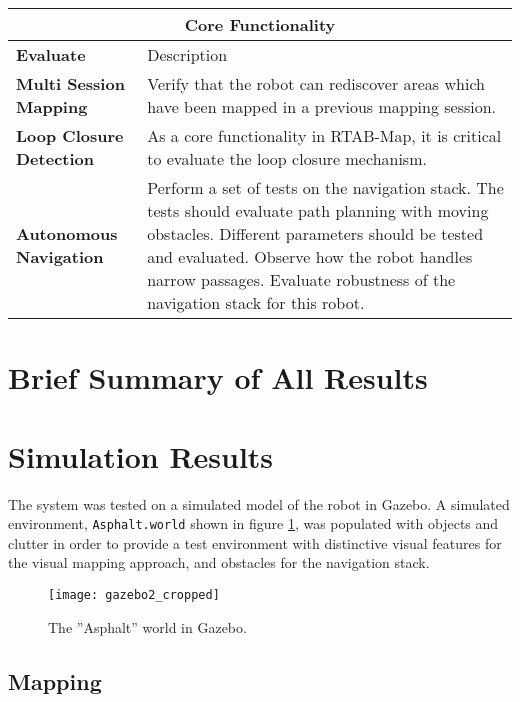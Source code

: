 \begin{table}
	\centering
	\begin{tabular}{ p{2.5cm} | p{7cm} }
	\multicolumn{2}{c}{Core Functionality}\\
\hline
	\textbf{Evaluate} & Description\\
	\hline
	\textbf{Multi Session Mapping} & Verify that the robot can rediscover areas which have been mapped in a previous mapping session.\\
	\hline
	\textbf{Loop Closure Detection} & As a core functionality in \ac{RTAB-Map}, it is critical to evaluate the loop closure mechanism.\\
	\hline
	\textbf{Autonomous Navigation} & Perform a set of tests on the navigation stack. The tests should evaluate path planning with moving obstacles. Different parameters should be tested and evaluated. Observe how the robot handles narrow passages. Evaluate robustness of the navigation stack for this robot.\\
	\hline
	\end{tabular}
	\caption{}
\end{table}

\section{Brief Summary of All Results}

\section{Simulation Results}

The system was tested on a simulated model of the robot in Gazebo. A simulated environment, \texttt{Asphalt.world} shown in figure \ref{fig:gazebo2_cropped}, was populated with objects and clutter in order to provide a test environment with distinctive visual features for the visual mapping approach, and obstacles for the navigation stack. 

\begin{figure}[h]
	\centering
	\texttt{[image: gazebo2\_cropped]}
	\caption{The ''Asphalt'' world in Gazebo. }
	\label{fig:gazebo2_cropped}
\end{figure}

\subsection{Mapping}

